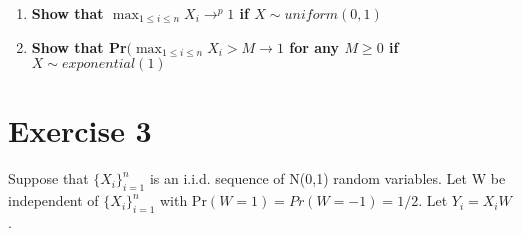 \documentclass[]{article}
\begin{document}
\begin{enumerate}[label = (\roman*)]
\begin{enumerate}[label = (\alph*)]
\item 

\item

\item 

\end{enumerate}


\item \textbf{Show that $\max_{1\le i \le n} X_i \rightarrow^p 1$ if $X \sim uniform(0,1)$}


\item \textbf{Show that Pr$(\max_{1\le i \le n} X_i >M \rightarrow 1$ for any $M\ge 0$ if $X \sim exponential(1)$}

\end{enumerate}



\section*{Exercise 3}
Suppose that $\{X_i\}_{i=1}^n $ is an i.i.d. sequence of N(0,1) random variables. Let W be independent of $\{X_i\}_{i=1}^n $ with Pr$(W=1)= Pr(W=-1)=1/2$. Let $Y_i = X_iW$. 
\end{document}
